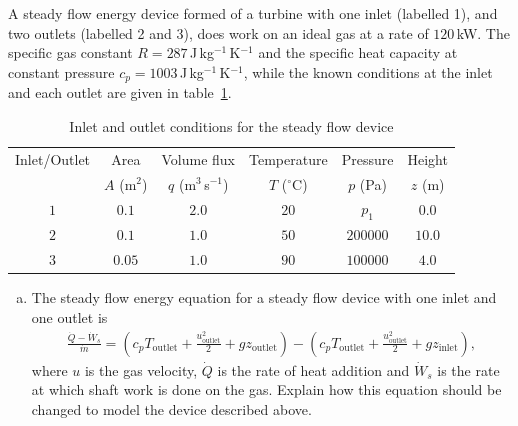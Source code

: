 \documentclass[calculator,steamtables,refrigeranttables,psychrometricchart,datasheet,solutions]{exam}
\begin{document}
\begin{question} 

A steady flow energy device formed of a turbine with one inlet (labelled 1), and two outlets (labelled 2 and 3), does work on an ideal gas at a rate of $120$\,kW. The specific gas constant $R=287$\,J\,kg$^{-1}$\,K$^{-1}$ and the specific heat capacity at constant pressure $c_p=1003$\,J\,kg$^{-1}$\,K$^{-1}$, while the known conditions at the inlet and each outlet are given in table~\ref{tab:multiInletOutlet}.

\begin{table}[!h]
\caption{Inlet and outlet conditions for the steady flow device}
\label{tab:multiInletOutlet}
\begin{center}
\begin{tabular}{| c || c | c | c | c | c |} \hline
Inlet/Outlet & Area       & Volume flux          & Temperature    & Pressure & Height  \\
             & $A$ (m$^2$) & $q$ (m$^3$\,s$^{-1}$) & $T$ ($^\circ$C) & $p$ (Pa)  & $z$ (m)  \\ \hline
$1$          & $0.1$      & $2.0$                & $20$           & $p_{1}$     & $0.0$   \\
$2$          & $0.1$      & $1.0$                & $50$           & $200000$ & $10.0$ \\
$3$          & $0.05$     & $1.0$                & $90$           & $100000$ & $4.0$  \\
\hline
\end{tabular}
\end{center}
\end{table}

\begin{enumerate}[(a)]
\item The steady flow energy equation for a steady flow device with one inlet and one outlet is
\begin{align*}
 \frac{\dot{Q} - \dot{W}_s}{\dot{m}} = \left(c_p T_\text{outlet} + \frac{u_\text{outlet}^2}{2} + g z_\text{outlet}\right) - \left(c_p T_\text{outlet} + \frac{u_\text{outlet}^2}{2} + g z_\text{inlet}\right),
\end{align*}
where $u$ is the gas velocity, $\dot{Q}$ is the rate of heat addition and $\dot{W}_s$ is the rate at which shaft work is done on the gas. Explain how this equation should be changed to model the device described above.~
\end{enumerate}
\end{question}
\end{document}
